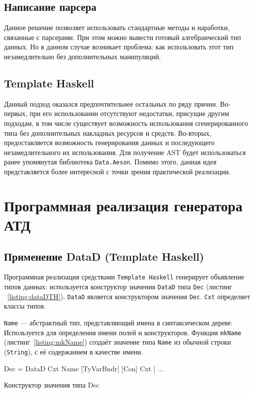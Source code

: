\subsection{Написание парсера}
Данное решение позволяет использовать стандартные методы и наработки, связанные с парсерами. При этом можно вывести готовый алгебраический тип данных. Но в данном случае возникает проблема: как использовать этот тип незамедлительно без дополнительных манипуляций.   	

\subsection{Template Haskell}
Данный подход оказался предпочтительнее остальных по ряду причин. Во-первых, при его использовании отсутствуют недостатки, присущие другим подходам, в том числе существует возможность использования сгенерированного типа без дополнительных накладных ресурсов и средств. Во-вторых, предоставляется возможность генерирования данных  и последующего незамедлительного их использования. Для получение AST будет использоваться ранее упомянутая библиотека \lstinline{Data.Aeson}. Помимо этого, данная идея представляется более интересной с точки зрения практической реализации. 

\section{Программная реализация генератора АТД}

\subsection{Применение DataD (Template Haskell)}

Программная реализация средствами \lstinline{Template Haskell} генерирует объявление типов данных: используется конструктор значения \lstinline{DataD} типа \lstinline{Dec} (листинг ~\ref{listing:dataDTH}). \lstinline{DataD} является конструктором значения \lstinline{Dec}. \lstinline{Cxt} определяет классы типов. 

\lstinline{Name} --- абстрактный тип, представляющий имена в синтаксическом дереве. Используется для определения имени полей и конструкторов. Функция \lstinline{mkName} (листинг~\ref{listing:mkName}) создаёт значение типа \lstinline{Name} из обычной строки (\lstinline{String}), с её содержанием в качестве имени.

\begin{ListingEnv}[H]
\begin{Verb}
Dec 
   = DataD Cxt Name [TyVarBndr] [Con] Cxt
   | ...
\end{Verb}
\caption{Конструктор значения типа Dec}
\label{listing:dataDTH}
\end{ListingEnv} 

